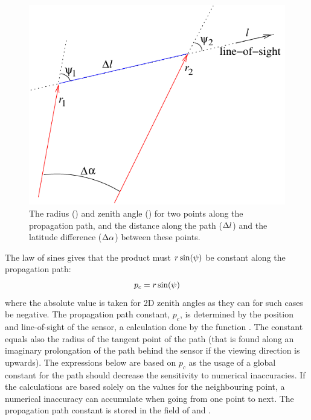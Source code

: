 \begin{figure}[!t]
 \begin{center}
  \begin{minipage}[c]{0.65\textwidth}
   \begin{center}
    \includegraphics*[width=0.9\hsize]{Figs/ppath/geom1d}
   \end{center}
  \end{minipage}%
  \begin{minipage}[c]{0.35\textwidth}
   \caption{The radius (\Rds) and zenith angle (\ZntAng) for two points along
     the propagation path, and the distance along the path ($\Delta l$)
     and the latitude difference ($\Delta\alpha$) between these points.}
   \label{fig:ppath:1d2dgeom}
  \end{minipage}
 \end{center}
\end{figure}   

The law of sines gives that the product must $r\sin(\psi)$ be
constant along the propagation path:
\begin{equation}
  p_c = r\sin(\psi)
  \label{eq:ppath:geomconst}
\end{equation}
where the absolute value is taken for 2D zenith angles as they can for
such cases be negative. The propagation path constant, $p_c$, is
determined by the position and line-of-sight of the sensor, a
calculation done by the function . The
constant equals also the radius of the tangent point of the path (that
is found along an imaginary prolongation of the path behind the sensor
if the viewing direction is upwards). The expressions below are based
on $p_c$ as the usage of a global constant for the path should
decrease the sensitivity to numerical inaccuracies. If the
calculations are based solely on the values for the neighbouring
point, a numerical inaccuracy can accumulate when going from one point
to next. The propagation path constant is stored in the field
 of  and .

